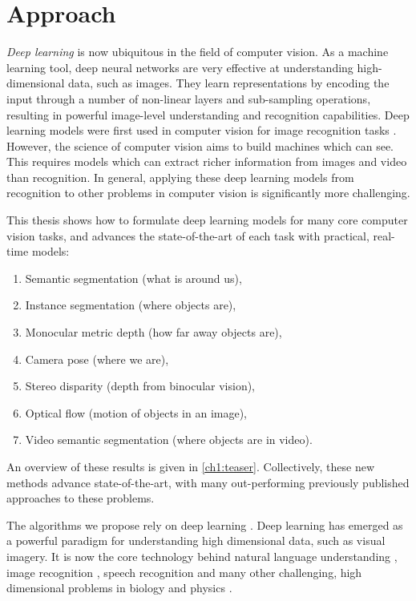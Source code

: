 \section{Approach}

\textit{Deep learning} \citep{goodfellow2016deep} is now ubiquitous in the field of computer vision. As a machine learning tool, deep neural networks are very effective at understanding high-dimensional data, such as images. They learn representations by encoding the input through a number of non-linear layers and sub-sampling operations, resulting in powerful image-level understanding and recognition capabilities.
Deep learning models were first used in computer vision for image recognition tasks \citep{lecun88,krizhevsky2012imagenet}.
However, the science of computer vision aims to build machines which can see. This requires models which can extract richer information from images and video than recognition. In general, applying these deep learning models from recognition to other problems in computer vision is significantly more challenging.

This thesis shows how to formulate deep learning models for many core computer vision tasks, and advances the state-of-the-art of each task with practical, real-time models:
\begin{enumerate}
\item Semantic segmentation (what is around us),
\item Instance segmentation (where objects are),
\item Monocular metric depth (how far away objects are),
\item Camera pose (where we are),
\item Stereo disparity (depth from binocular vision),
\item Optical flow (motion of objects in an image),
\item Video semantic segmentation (where objects are in video).
\end{enumerate}
An overview of these results is given in \cref{ch1:teaser}. Collectively, these new methods advance state-of-the-art, with many out-performing previously published approaches to these problems.

The algorithms we propose rely on deep learning \citep{hinton2006fast}. Deep learning has emerged as a powerful paradigm for understanding high dimensional data, such as visual imagery. It is now the core technology behind natural language understanding \citep{sutskever2014sequence}, image recognition \citep{krizhevsky2012imagenet}, speech recognition \citep{hinton2012deep} and many other challenging, high dimensional problems in biology and physics \citep{leung2014deep,helmstaedter2013connectomic,ciodaro2012online}.

